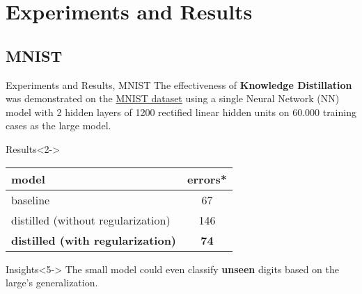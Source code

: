 \documentclass[aspectratio=1610]{beamer}
\begin{document}
    \section*{Experiments and Results}

    \subsection*{MNIST}
    \begin{frame}{Experiments and Results, MNIST}
        The effectiveness of \textbf{Knowledge Distillation} was demonstrated on the \href{https://www.tensorflow.org/datasets/catalog/mnist?hl=pt-br}{MNIST dataset} using a single Neural Network (NN) model with 2 hidden layers of 1200 rectified linear hidden units on 60.000 training cases as the large model.

        \begin{block}{Results}<2->
            \begin{table}[H]
                \centering
                \begin{tabular}{lc}
                    \hline\hline
                    model & errors*\\
                    \hline
                    baseline & 67\\
                    distilled (without regularization) & 146\\
                    \textbf{distilled (with regularization)} & \textbf{74}\\
                    \hline\hline
                \end{tabular}
                \label{tab:mnist}
            \end{table}
        \end{block}

        \begin{alertblock}{Insights}<5->
            The small model could even classify \textbf{unseen} digits based on the large's generalization.
        \end{alertblock}
    \end{frame}
\end{document}
